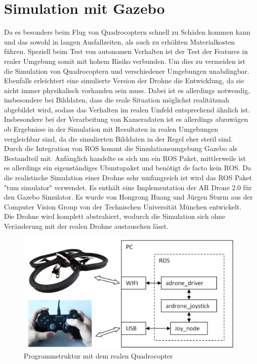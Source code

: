 \section{Simulation mit Gazebo}
Da es besonders beim Flug von Quadrocoptern schnell zu Schäden kommen kann und das sowohl  in langen Ausfallzeiten, als auch zu erhöhten Materialkosten führen. Speziell beim Test von autonomen Verhalten ist der Test der Features in realer Umgebung somit mit hohem Risiko verbunden. Um dies zu vermeiden ist die Simulation von Quadrocoptern und verschiedener Umgebungen unabdingbar. Ebenfalls erleichtert eine simulierte Version der Drohne die Entwicklung, da sie nicht immer physikalisch vorhanden sein muss. Dabei ist es allerdings notwendig, insbesondere
bei Bilddaten, dass die reale Situation möglichst realitätsnah abgebildet wird, sodass
das Verhalten im realen Umfeld entsprechend ähnlich ist. Insbesondere bei der
Verarbeitung von Kameradaten ist es allerdings abzuwägen ob Ergebnisse in der Simulation
mit Resultaten in realen Umgebungen vergleichbar sind, da die simulierten
Bilddaten in der Regel eher steril sind.\newline
Durch die Integration von ROS kommt die Simulationsumgebung Gazebo als Bestandteil
mit. Anfänglich handelte es sich um ein ROS Paket, mittlerweile ist es allerdings
ein eigenständiges Ubuntupaket und benötigt de facto kein ROS.
\newline
Da die realistische Simulation einer Drohne sehr umfangreich ist wird das ROS Paket "tum simulator" verwendet. Es enthält eine Implementation der AR Drone 2.0 für den Gazebo Simulator. Es wurde von Hongrong Huang und Jürgen Sturm
 aus der Computer Vision Group von der Technischen Universität München entwickelt. Die Drohne wird komplett abstrahiert, wodurch die Simulation sich ohne Veränderung mit der realen Drohne austauschen lässt. 
 \begin{figure}[ht]
 	\centering
 	\includegraphics[scale=0.9]{Bilder/real_structure.png}
 	\caption[Programmstruktur mit dem realen Quadrocopter]{Programmstruktur mit dem realen Quadrocopter \cite{real_structure}}
 	
 \end{figure}
